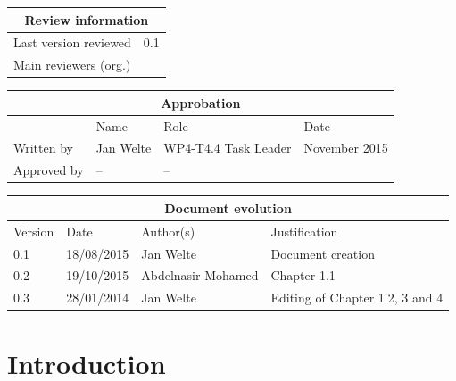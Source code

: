 \begin{tabular}{|p{4.4cm}|p{8.7cm}|}
\hline
\multicolumn{2}{|c|}{Review information} \\
\hline
Last version reviewed & 0.1 \\
\hline
Main reviewers (org.) & \\
\hline
\end{tabular}

\begin{tabular}{|p{2.2cm}|p{4cm}|p{4cm}|p{2cm}|}
\hline
\multicolumn{4}{|c|}{Approbation} \\
\hline
  &  Name & Role & Date   \\
\hline  
Written by    &  Jan Welte & WP4-T4.4 Task Leader  &  November 2015\\
\hline
Approved by & -- & -- & \\
\hline
\end{tabular}

\begin{tabular}{|p{2.2cm}|p{2cm}|p{4cm}|p{4cm}|}
\hline
\multicolumn{4}{|c|}{Document evolution} \\
\hline
Version &  Date & Author(s) & Justification  \\
\hline
0.1 & 18/08/2015 & Jan Welte &  Document creation \\
\hline 
0.2 & 19/10/2015 & Abdelnasir Mohamed & Chapter 1.1 \\
\hline  
0.3 & 28/01/2014 & Jan Welte & Editing of Chapter 1.2, 3 and 4  \\

\hline  
\end{tabular}
\newpage


\mainmatter

\chapter{Introduction}
\label{sec:introduction}


